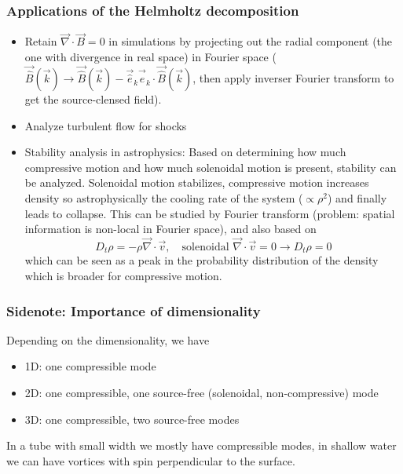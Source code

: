 \subsubsection{Applications of the Helmholtz decomposition}
\begin{itemize}
    \item Retain $\vec{\nabla} \cdot \vec{B} = 0$ in simulations by projecting out the radial component (the one with divergence in real space) in Fourier space ($\vec{\hat{B}}(\vec{k}) \rightarrow \vec{\hat{B}}(\vec{k}) - \vec{\hat{e}}_k \vec{\hat{e}}_k  \cdot \vec{\hat{B}}(\vec{k})$, then apply inverser Fourier transform to get the source-clensed field).
    \item Analyze turbulent flow for shocks
    \item Stability analysis in astrophysics: Based on determining how much compressive motion and how much solenoidal motion is present, stability can be analyzed. Solenoidal motion stabilizes, compressive motion increases density so astrophysically the cooling rate of the system ($\propto \rho^2$) and finally leads to collapse.
    This can be studied by Fourier transform (problem: spatial information is non-local in Fourier space), and also based on
    \begin{equation}
        D_t \rho = - \rho \vec{\nabla} \cdot \vec{v}, \quad \text{solenoidal } \vec{\nabla} \cdot \vec{v} = 0 \rightarrow D_t \rho = 0
    \end{equation}
    which can be seen as a peak in the probability distribution of the density which is broader for compressive motion.
\end{itemize}

\subsubsection{Sidenote: Importance of dimensionality}
Depending on the dimensionality, we have
\begin{itemize}
    \item 1D: one compressible mode
    \item 2D: one compressible, one source-free (solenoidal, non-compressive) mode
    \item 3D: one compressible, two source-free modes
\end{itemize}

In a tube with small width we mostly have compressible modes, in shallow water we can have vortices with spin perpendicular to the surface.

\pagebreak